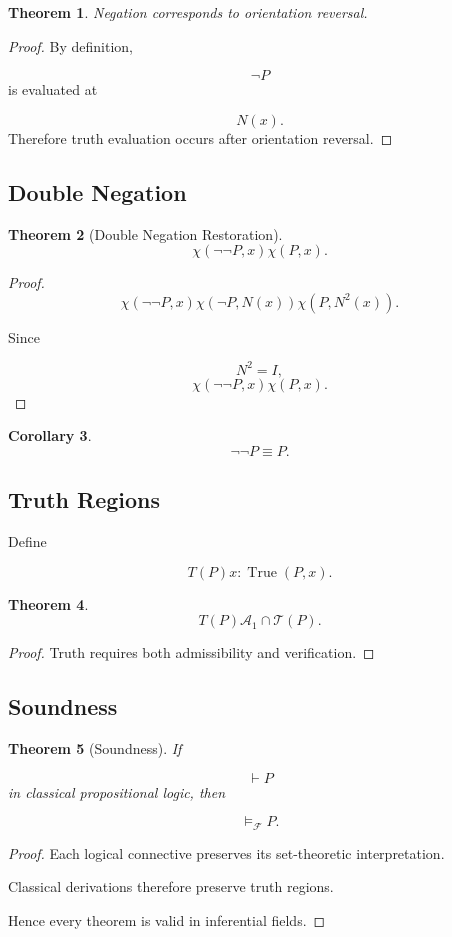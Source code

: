 \documentclass[12pt]{article}
\newtheorem{theorem}{Theorem}[section]
\newtheorem{corollary}[theorem]{Corollary}
\theoremstyle{remark}
\begin{document}
\begin{theorem}
Negation corresponds to orientation reversal.
\end{theorem}

\begin{proof}
By definition,

\[
\neg P
\]
is evaluated at

\[
N(x).
\]
Therefore truth evaluation occurs after orientation reversal.
\end{proof}

\subsection{Double Negation}

\begin{theorem}[Double Negation Restoration]
\[
\chi(\neg\neg P,x)
\chi(P,x).
\]
\end{theorem}

\begin{proof}
\[
\chi(\neg\neg P,x)
\chi(\neg P,N(x))

\chi(P,N^2(x)).
\]

Since

\[
N^2=I,
\]
\[
\chi(\neg\neg P,x)
\chi(P,x).
\]
\end{proof}

\begin{corollary}
\[
\neg\neg P
\equiv
P.
\]
\end{corollary}
\subsection{Truth Regions}

Define

\[
T(P)
{
x:
\operatorname{True}(P,x)
}.
\]

\begin{theorem}
\[
T(P)
\mathcal A_1
\cap
\mathcal T(P).
\]
\end{theorem}

\begin{proof}
Truth requires both admissibility and verification.
\end{proof}

\subsection{Soundness}

\begin{theorem}[Soundness]
If

\[
\vdash P
\]
in classical propositional logic, then

\[
\models_{\mathcal F} P.
\]
\end{theorem}
\begin{proof}
Each logical connective preserves its set-theoretic interpretation.

Classical derivations therefore preserve truth regions.

Hence every theorem is valid in inferential fields.
\end{proof}
\end{document}
